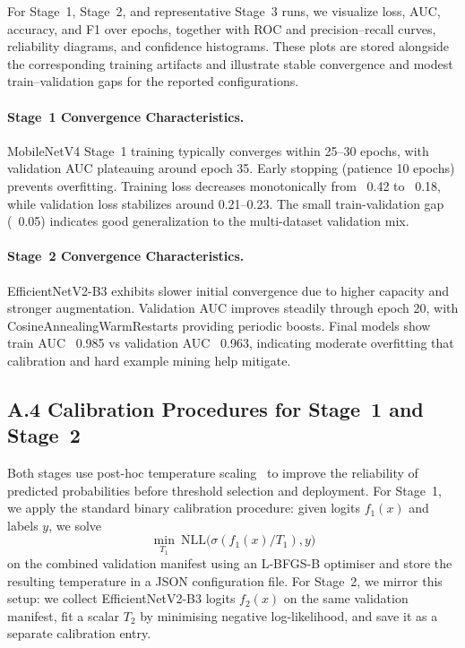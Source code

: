 For Stage~1, Stage~2, and representative Stage~3 runs, we visualize loss, AUC, accuracy, and F1 over epochs, together with ROC and precision--recall curves, reliability diagrams, and confidence histograms. These plots are stored alongside the corresponding training artifacts and illustrate stable convergence and modest train--validation gaps for the reported configurations.

\paragraph{Stage~1 Convergence Characteristics.}
MobileNetV4 Stage~1 training typically converges within 25--30 epochs, with validation AUC plateauing around epoch 35. Early stopping (patience 10 epochs) prevents overfitting. Training loss decreases monotonically from ~0.42 to ~0.18, while validation loss stabilizes around 0.21--0.23. The small train-validation gap (~0.05) indicates good generalization to the multi-dataset validation mix.

\paragraph{Stage~2 Convergence Characteristics.}
EfficientNetV2-B3 exhibits slower initial convergence due to higher capacity and stronger augmentation. Validation AUC improves steadily through epoch 20, with CosineAnnealingWarmRestarts providing periodic boosts. Final models show train AUC ~0.985 vs validation AUC ~0.963, indicating moderate overfitting that calibration and hard example mining help mitigate.

\subsection*{A.4 Calibration Procedures for Stage~1 and Stage~2}

Both stages use post\hyp hoc temperature scaling~\cite{guo2017calibration} to improve the reliability of predicted probabilities before threshold selection and deployment. For Stage~1, we apply the standard binary calibration procedure: given logits $f_1(x)$ and labels $y$, we solve
\[
  \min_{T_1}\ \mathrm{NLL}\big(\sigma(f_1(x)/T_1), y\big)
\]
on the combined validation manifest using an L\hyp BFGS\hyp B optimiser and store the resulting temperature in a JSON configuration file. For Stage~2, we mirror this setup: we collect EfficientNetV2\hyp B3 logits $f_2(x)$ on the same validation manifest, fit a scalar $T_2$ by minimising negative log-likelihood, and save it as a separate calibration entry.


